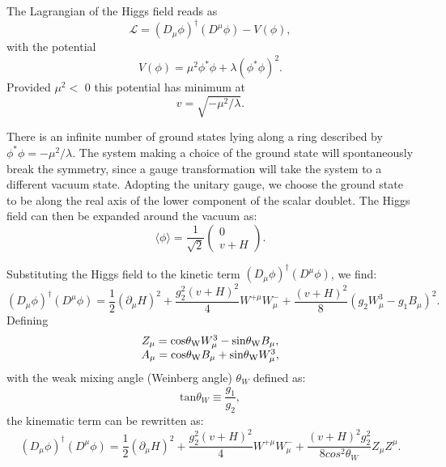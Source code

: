 \documentclass[thesis.tex]{subfiles}
\begin{document}
The Lagrangian of the Higgs field reads as
	\begin{equation}
		\mathcal{L} = (D_\mu \phi)^\dagger(D^\mu\phi) - V(\phi),
	\end{equation}	
with the potential 
	\begin{equation}
		V(\phi) = \mu^2\phi^*\phi + \lambda(\phi^*\phi)^2.
	\end{equation}
Provided $\mu^2 <$ 0 this potential has minimum at 
	\begin{equation}
		v = \sqrt{ -\mu^2/\lambda}.
	\end{equation}
	
There is an infinite number of ground states lying along a ring described by $\phi^*\phi = - \mu^2/\lambda$. 
The system making a choice of the ground state will spontaneously break the symmetry, since a gauge transformation will take the system to a different vacuum state. 
Adopting the unitary gauge, we choose the ground state to be along the real axis of the lower component of the scalar doublet.
The Higgs field can then be expanded around the vacuum as:
	\begin{equation}
		\langle \phi \rangle = \frac{1}{\sqrt{2}} \left( \begin{array}{c} 0\\v+H \end{array} \right).
	\end{equation}

Substituting the Higgs field to the kinetic term $(D_\mu \phi)^\dagger(D^\mu\phi)$, we find:
	\begin{equation}
		(D_\mu \phi)^\dagger(D^\mu\phi) = \frac{1}{2}(\partial_\mu H)^2 + \frac{g_2^2(v+H)^2}{4}W^{+\mu}W_{\mu}^- + \frac{(v+H)^2}{8}(g_2W_\mu^3 - g_1B_\mu)^2.
	\end{equation}
Defining
	\begin{equation}
	\begin{array}{c}
		Z_\mu = \text{cos} \mathrm{\theta_W} W_\mu^3 - \text{sin} \mathrm{\theta_W} B_\mu, \\
		A_\mu = \text{cos} \mathrm{\theta_W} B_\mu + \text{sin} \mathrm{\theta_W} W_\mu^3,
	\end{array}
	\end{equation}
with the weak mixing angle (Weinberg angle) $\theta_W$ defined as:
	\begin{equation}
		\text{tan} \theta_W \equiv \frac{g_1}{g_2},
	\end{equation}
the kinematic term can be rewritten as:
	\begin{equation}
		(D_\mu \phi)^\dagger(D^\mu\phi) = \frac{1}{2}(\partial_\mu H)^2 + \frac{g_2^2(v+H)^2}{4}W^{+\mu}W_{\mu}^- + \frac{(v+H)^2g_2^2}{8cos^2\theta_W}Z_\mu Z^\mu.
		\label{eq:eathiggs}
	\end{equation}
	
\end{document}

